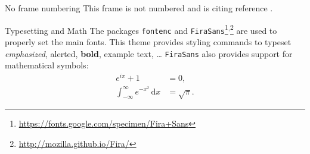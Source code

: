     \begin{frame}{No frame numbering}
        This frame is not numbered and is citing reference \cite{knuth74}.
    \end{frame}
    
    \begin{frame}{Typesetting and Math}
        The packages \texttt{fontenc} and \texttt{FiraSans}\footnote{\url{https://fonts.google.com/specimen/Fira+Sans}}\textsuperscript{,}\footnote{\url{http://mozilla.github.io/Fira/}} are used to properly set the main fonts.
        \vfill
        This theme provides styling commands to typeset \emph{emphasized}, \alert{alerted}, \textbf{bold}, \textcolor{example}{example text}, \dots
        \vfill
        \texttt{FiraSans} also provides support for mathematical symbols:
        \begin{align*}
            e^{i\pi} + 1 & = 0, \\
            \int_{-\infty}^\infty e^{-x^2}\,\mathrm{d}x & = \sqrt{\pi}.
        \end{align*}
    \end{frame}



